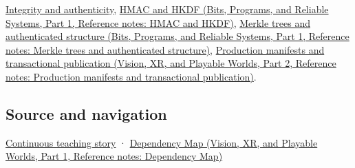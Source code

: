 \hypertarget{appendix-ed338677de0a-used-by}{}

\hyperref[appendix-cbe594d1ab0a]{Integrity and authenticity}, \href{../01-Bits-Programs-and-Reliable-Systems-P01/main.pdf\#appendix-50af792c9da7}{HMAC and HKDF (Bits, Programs, and Reliable Systems, Part 1, Reference notes: HMAC and HKDF)}, \href{../01-Bits-Programs-and-Reliable-Systems-P01/main.pdf\#appendix-098192f8d46d}{Merkle trees and authenticated structure (Bits, Programs, and Reliable Systems, Part 1, Reference notes: Merkle trees and authenticated structure)}, \href{../07-Vision-XR-and-Playable-Worlds-P02/main.pdf\#appendix-91eaa3cbdbc3}{Production manifests and transactional publication (Vision, XR, and Playable Worlds, Part 2, Reference notes: Production manifests and transactional publication)}.

\subsection{Source and navigation}\label{appendix-ed338677de0a-source-and-navigation}

\hypertarget{appendix-ed338677de0a-source-and-navigation}{}

\hyperref[01-foundations-i-ch002-bytes-become-a-durable-agreement]{Continuous teaching story} · \href{../07-Vision-XR-and-Playable-Worlds-P01/main.pdf\#appendix-4ad47bdd269a}{Dependency Map (Vision, XR, and Playable Worlds, Part 1, Reference notes: Dependency Map)}
